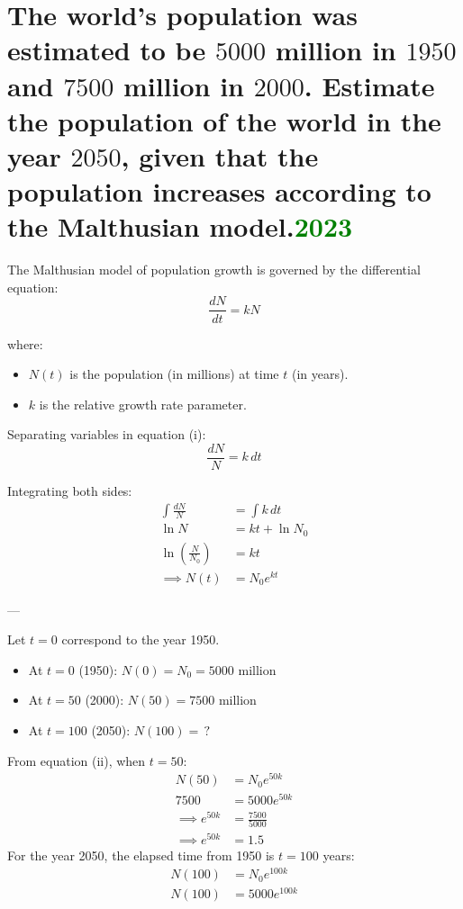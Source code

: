 \section{The world's population was estimated to be $5000$ million in $1950$ and $7500$ million in $2000$. Estimate the population of the world in the year $2050$, given that the population increases according to the Malthusian model.\textcolor{green}{2023}}
The Malthusian model of population growth is governed by the differential equation:
\begin{equation}
    \frac{dN}{dt} = kN \tag{i}
\end{equation}

where:
\begin{itemize}
    \item $N(t)$ is the population (in millions) at time $t$ (in years).
    \item $k$ is the relative growth rate parameter.
\end{itemize}

Separating variables in equation (i):
\begin{equation*}
    \frac{dN}{N} = k \, dt
\end{equation*}

Integrating both sides:
\begin{align*}
    \int \frac{dN}{N} &= \int k \, dt \\[1ex]
    \ln N &= kt + \ln N_0 \\[1ex]
    \ln\left(\frac{N}{N_0}\right) &= kt \\[1ex]
    \implies N(t) &= N_0 e^{kt} \tag{ii}
\end{align*}

---

Let $t = 0$ correspond to the year 1950.
\begin{itemize}
    \item At $t = 0$ (1950): $N(0) = N_0 = 5000 \text{ million}$
    \item At $t = 50$ (2000): $N(50) = 7500 \text{ million}$
    \item At $t = 100$ (2050): $N(100) = \,?$
\end{itemize}

From equation (ii), when $t = 50$:
\begin{align*}
    N(50) &= N_0 e^{50k} \\[1ex]
    7500 &= 5000 e^{50k} \\[1ex]
    \implies e^{50k} &= \frac{7500}{5000} \\[1ex]
    \implies e^{50k} &= 1.5 \tag{iii}
\end{align*}
For the year 2050, the elapsed time from 1950 is $t = 100$ years:
\begin{align*}
    N(100) &= N_0 e^{100k} \\[1ex]
    N(100) &= 5000 e^{100k}
\end{align*}

